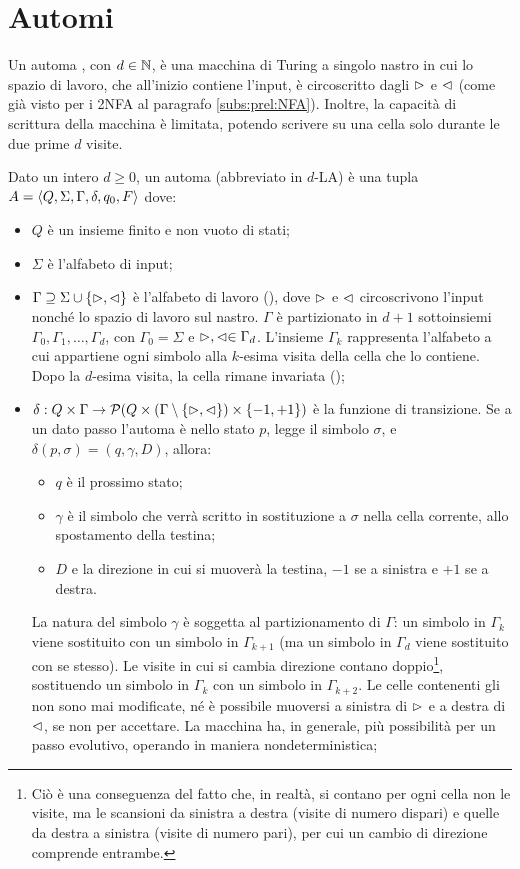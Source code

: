 \section{Automi }
Un automa , con $d\in\mathbb N$, è una macchina di Turing a singolo nastro in cui lo spazio di lavoro, che all'inizio contiene l'input, è circoscritto dagli  $\vartriangleright$ e $\vartriangleleft$ (come già visto per i 2NFA al paragrafo \ref{subs:prel:NFA}). Inoltre, la capacità di scrittura della macchina è limitata, potendo scrivere su una cella solo durante le due prime $d$ visite.
\begin{defin}
	Dato un intero $d\geq 0$, un automa  (abbreviato in $d$-LA) è una tupla $A=\langle Q,\Sigma,\Gamma,\delta,q_0,F \rangle$ dove:
	\begin{itemize}
		\item $Q$ è un insieme finito e non vuoto di stati;
		\item $\Sigma$ è l'alfabeto di input;
		\item $\Gamma\supseteq\Sigma\cup\left\{ \vartriangleright,\vartriangleleft \right\}$ è l'alfabeto di lavoro (), dove $\vartriangleright$ e $\vartriangleleft$ circoscrivono l'input nonché lo spazio di lavoro sul nastro. $\Gamma$ è partizionato in $d+1$ sottoinsiemi $\Gamma_0,\Gamma_1,\dots,\Gamma_d$, con $\Gamma_0=\Sigma$ e $\vartriangleright,\vartriangleleft\in\Gamma_d$. L'insieme $\Gamma_k$ rappresenta l'alfabeto a cui appartiene ogni simbolo alla $k$-esima visita della cella che lo contiene. Dopo la $d$-esima visita, la cella rimane invariata ();
		\item $\delta:Q\times\Gamma\to \mathcal P(Q\times(\Gamma\setminus\left\{ \vartriangleright,\vartriangleleft \right\})\times\left\{ -1,+1 \right\})$ è la funzione di transizione. Se a un dato passo l'automa è nello stato $p$, legge il simbolo $\sigma$, e $\delta(p,\sigma)=(q,\gamma,D)$, allora:
		      \begin{itemize}
			      \item $q$ è il prossimo stato;
			      \item $\gamma$ è il simbolo che verrà scritto in sostituzione a $\sigma$ nella cella corrente, allo spostamento della testina;
			      \item $D$ e la direzione in cui si muoverà la testina, $-1$ se a sinistra e $+1$ se a destra.
		      \end{itemize}
		      La natura del simbolo $\gamma$ è soggetta al partizionamento di $\Gamma$: un simbolo in $\Gamma_k$ viene sostituito con un simbolo in $\Gamma_{k+1}$ (ma un simbolo in $\Gamma_d$ viene sostituito con se stesso). Le visite in cui si cambia direzione contano doppio\footnote{Ciò è una conseguenza del fatto che, in realtà, si contano per ogni cella non le visite, ma le scansioni da sinistra a destra (visite di numero dispari) e quelle da destra a sinistra (visite di numero pari), per cui un cambio di direzione comprende entrambe.}, sostituendo un simbolo in $\Gamma_k$ con un simbolo in $\Gamma_{k+2}$. Le celle contenenti gli  non sono mai modificate, né è possibile muoversi a sinistra di $\vartriangleright$ e a destra di $\vartriangleleft$, se non per accettare. La macchina ha, in generale, più possibilità per un passo evolutivo, operando in maniera nondeterministica;

\end{itemize}
\end{defin}
